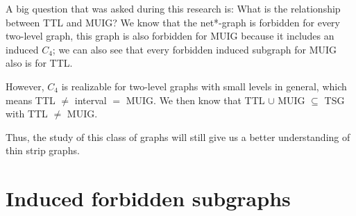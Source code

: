 A big question that was asked during this research is: What is the relationship between TTL and MUIG? We know that the net*-graph is forbidden for every two-level graph, this graph is also forbidden for MUIG because it includes an induced $C_4$; we can also see that every forbidden induced subgraph for MUIG also is for TTL.

However, $C_4$ is realizable for two-level graphs with small levels in general, which means TTL $\neq$ interval $=$ MUIG. We then know that TTL $\cup$ MUIG $\subseteq$ TSG with TTL $\neq$ MUIG.

Thus, the study of this class of graphs will still give us a better understanding of thin strip graphs.

\section{Induced forbidden subgraphs}

